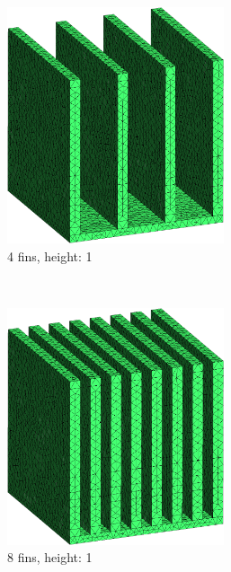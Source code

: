  \begin{figure}[h t!]
 \begin{subfigure}[t] {0.23\textwidth}
 \centering
 \includegraphics[width=0.7\textwidth]{"../figures/mesh_4_1 (new)"}
 \caption{4 fins, height: 1}
 \label{fig:mesh_4_1}
 \end{subfigure}
 ~
  \begin{subfigure}[t] {0.23\textwidth}
 \centering
 \includegraphics[width=0.7\textwidth]{"../figures/mesh_8_1 (new)"}
 \caption{8 fins, height: 1}
 \label{fig:mesh_8_1}
 \end{subfigure}
 ~
 \begin{subfigure}[t] {0.23\textwidth}
 \centering

\end{subfigure}
\end{figure}
